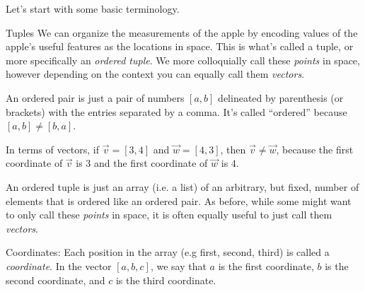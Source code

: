 \documentclass{ximera}
\begin{document}
\begin{remark}

  Let's start with some basic terminology. 

\begin{definition}
    \item[Tuples] We can organize the measurements of the apple by encoding values of the apple's useful features as the locations in space. This is what's called a tuple, or more specifically an \textit{ordered tuple}. We more colloquially call these \textit{points} in space, however depending on the context you can equally call them \textit{vectors}.


    \item[An ordered pair] is just a pair of numbers $[a,b]$ delineated by parenthesis (or brackets) with the entries separated by a comma. It's called ``ordered'' because $[a,b] \ne [b,a]$. 
    
    \begin{example}

      In terms of vectors, if $\vec{v}=[3,4]$ and $\vec{w}=[4,3]$, then $\vec{v}\ne \vec{w}$, because the first coordinate of $\vec{v}$ is $3$ and the first coordinate of $\vec{w}$ is $4$.

    \end{example}
    
    \item[An ordered tuple] is just an array (i.e. a list) of an arbitrary, but fixed, number of elements that is ordered like an ordered pair. As before, while some might want to only call these \emph{points} in space, it is often equally useful to just call them \emph{vectors}.
    
    \item[Coordinates:] Each position in the array (e.g first, second, third) is called a \textit{coordinate}. In the vector $[a, b, c]$, we say that $a$ is the first coordinate, $b$ is the second coordinate, and $c$ is the third coordinate. 

\end{definition}
\end{remark}
\end{document}
